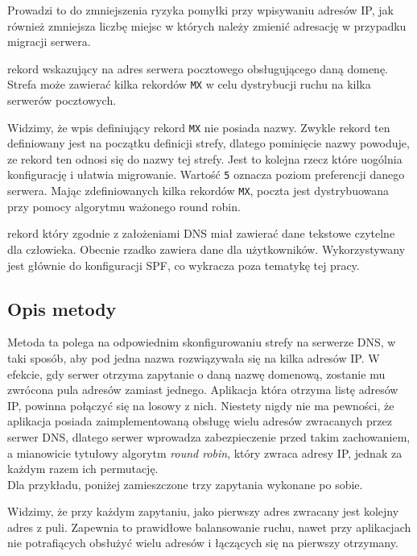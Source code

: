 {\begin{description}
Prowadzi to do zmniejszenia ryzyka pomyłki przy wpisywaniu adresów IP, jak również zmniejsza liczbę miejsc w których należy zmienić adresację w przypadku migracji serwera.
\item[MX] rekord wskazujący na adres serwera pocztowego obsługującego daną domenę.
Strefa może zawierać kilka rekordów \texttt{MX} w celu dystrybucji ruchu na kilka serwerów pocztowych.

Widzimy, że wpis definiujący rekord \texttt{MX} nie posiada nazwy. Zwykle rekord ten definiowany jest na początku definicji strefy, dlatego pominięcie nazwy powoduje, ze rekord ten odnosi się do nazwy tej strefy.
Jest to kolejna rzecz które uogólnia konfigurację i ułatwia migrowanie.
Wartość \texttt{5} oznacza poziom preferencji danego serwera. Mając zdefiniowanych kilka rekordów \texttt{MX}, poczta jest dystrybuowana przy pomocy algorytmu ważonego round robin.
\item[TXT] rekord który zgodnie z założeniami DNS miał zawierać dane tekstowe czytelne dla człowieka.
Obecnie rzadko zawiera dane dla użytkowników. Wykorzystywany jest głównie do konfiguracji SPF, co wykracza poza tematykę tej pracy.
\end{description}
\subsection{Opis metody}
Metoda ta polega na odpowiednim skonfigurowaniu strefy na serwerze DNS, w taki sposób, aby pod jedna nazwa rozwiązywała się na kilka adresów IP.
W efekcie, gdy serwer otrzyma zapytanie o daną nazwę domenową, zostanie mu zwrócona pula adresów zamiast jednego.
Aplikacja która otrzyma listę adresów IP, powinna połączyć się na losowy z nich.
Niestety nigdy nie ma pewności, że aplikacja posiada zaimplementowaną obsługę wielu adresów zwracanych przez serwer DNS, dlatego serwer wprowadza zabezpieczenie przed takim zachowaniem, a mianowicie tytułowy algorytm \textit{round robin}, który zwraca adresy IP, jednak za każdym razem ich permutację.\\
Dla przykładu, poniżej zamieszczone trzy zapytania wykonane po sobie.

Widzimy, że przy każdym zapytaniu, jako pierwszy adres zwracany jest kolejny adres z puli. Zapewnia to prawidłowe balansowanie ruchu, nawet przy aplikacjach nie potrafiących obsłużyć wielu adresów i łączących się na pierwszy otrzymany.

}
